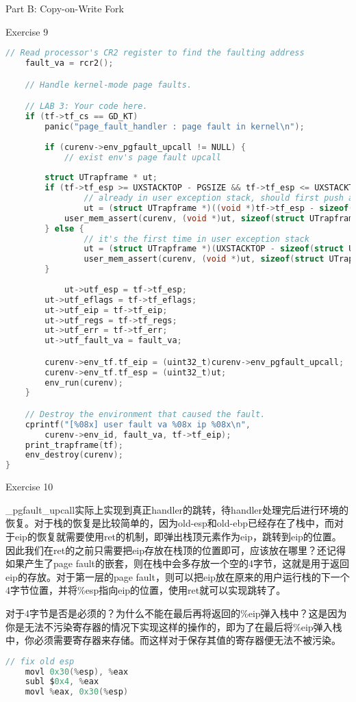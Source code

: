 \documentclass[GBK,winfonts,a4paper,10pt]{ctexart}
\begin{document}
\begin{section}{Part B: Copy-on-Write Fork}
\begin{subsection}{Exercise 9}
\begin{lstlisting}[language=C]
	// Read processor's CR2 register to find the faulting address
	fault_va = rcr2();

	// Handle kernel-mode page faults.

	// LAB 3: Your code here.
	if (tf->tf_cs == GD_KT)
    	panic("page_fault_handler : page fault in kernel\n");
    
    	if (curenv->env_pgfault_upcall != NULL) {
    		// exist env's page fault upcall
		
   	 	struct UTrapframe * ut;
   	 	if (tf->tf_esp >= UXSTACKTOP - PGSIZE && tf->tf_esp <= UXSTACKTOP - 1) {
    			// already in user exception stack, should first push an empty 32-bit word
    			ut = (struct UTrapframe *)((void *)tf->tf_esp - sizeof(struct UTrapframe) - 4);
	 	   	user_mem_assert(curenv, (void *)ut, sizeof(struct UTrapframe) + 4, PTE_U | PTE_W);
  	  	} else {
    			// it's the first time in user exception stack
    			ut = (struct UTrapframe *)(UXSTACKTOP - sizeof(struct UTrapframe));
		    	user_mem_assert(curenv, (void *)ut, sizeof(struct UTrapframe), PTE_U | PTE_W);
   	 	}
    	
    		ut->utf_esp = tf->tf_esp;
   	 	ut->utf_eflags = tf->tf_eflags;
   	 	ut->utf_eip = tf->tf_eip;
		ut->utf_regs = tf->tf_regs;
		ut->utf_err = tf->tf_err;
		ut->utf_fault_va = fault_va;

		curenv->env_tf.tf_eip = (uint32_t)curenv->env_pgfault_upcall;
		curenv->env_tf.tf_esp = (uint32_t)ut;
   	 	env_run(curenv);
    } 

	// Destroy the environment that caused the fault.
	cprintf("[%08x] user fault va %08x ip %08x\n",
		curenv->env_id, fault_va, tf->tf_eip);
	print_trapframe(tf);
	env_destroy(curenv);
}
\end{lstlisting}
\end{subsection}

\begin{subsection}{Exercise 10}
\par
\_pgfault\_upcall实际上实现到真正handler的跳转，待handler处理完后进行环境的恢复。对于栈的恢复是比较简单的，因为old-esp和old-ebp已经存在了栈中，而对于eip的恢复就需要使用ret的机制，即弹出栈顶元素作为eip，跳转到eip的位置。因此我们在ret的之前只需要把eip存放在栈顶的位置即可，应该放在哪里？还记得如果产生了page fault的嵌套，则在栈中会多存放一个空的4字节，这就是用于返回eip的存放。对于第一层的page fault，则可以把eip放在原来的用户运行栈的下一个4字节位置，并将\%esp指向eip的位置，使用ret就可以实现跳转了。
\par
对于4字节是否是必须的？为什么不能在最后再将返回的\%eip弹入栈中？这是因为你是无法不污染寄存器的情况下实现这样的操作的，即为了在最后将\%eip弹入栈中，你必须需要寄存器来存储。而这样对于保存其值的寄存器便无法不被污染。
\begin{lstlisting}[language=C]
	// fix old esp
	movl 0x30(%esp), %eax
	subl $0x4, %eax
	movl %eax, 0x30(%esp)


\end{lstlisting}
\end{subsection}
\end{section}
\end{document}
